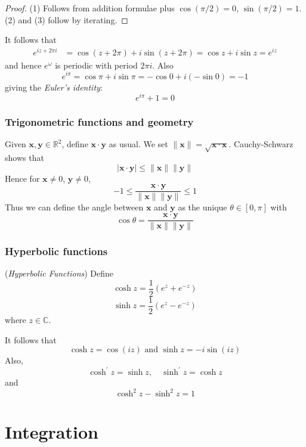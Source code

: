 \documentclass[10pt, a4paper, twoside]{report}
\begin{document}
\begin{proof}
    (1) Follows from addition formulae plus \(\cos(\pi/2)=0\), \(\sin(\pi/2)=1\). (2) and (3) follow by iterating.
\end{proof}
It follows that 
\begin{align*}
    e^{iz+2\pi i}&=\cos(z+2\pi)+i\sin(z+2\pi)=\cos z+i\sin z=e^{iz}
\end{align*}
and hence \(e^\omega\) is periodic with period \(2\pi i\). Also 
\[e^{i\pi}=\cos\pi+i\sin\pi=-\cos 0+i(-\sin 0)=-1\]
giving the \emph{Euler's identity}:
\[e^{i\pi}+1=0\]
\subsubsection{Trigonometric functions and geometry}
Given \(\mathbf{x},\mathbf{y}\in\mathbb{R}^2\), define \(\mathbf{x}\cdot\mathbf{y}\) as usual. We set \(\|\mathbf{x}\|=\sqrt{\mathbf{x}\cdot\mathbf{x}}\). Cauchy-Schwarz shows that 
\[|\mathbf{x}\cdot\mathbf{y}|\leq\|\mathbf{x}\|\|\mathbf{y}\|\]
Hence for \(\mathbf{x}\neq 0\), \(\mathbf{y}\neq 0\),
\[-1\leq\frac{\mathbf{x}\cdot\mathbf{y}}{\|\mathbf{x}\|\|\mathbf{y}\|}\leq 1\]
Thus we can define the angle between \(\mathbf{x}\) and \(\mathbf{y}\) as the unique \(\theta\in[0,\pi]\) with 
\[\cos\theta=\frac{\mathbf{x}\cdot\mathbf{y}}{\|\mathbf{x}\|\|\mathbf{y}\|}\]
\subsubsection{Hyperbolic functions}
\begin{definition}
    (\emph{Hyperbolic Functions}) Define 
    \[\cosh z=\frac 12(e^z+e^{-z})\]
    \[\sinh z=\frac 12(e^z-e^{-z})\]
    where \(z\in\mathbb{C}\).
\end{definition}
It follows that 
\[\cosh z=\cos(iz)\text{  and }\sinh z=-i\sin(iz)\]
Also,
\[\cosh^\prime z=\sinh z,\quad\sinh^\prime z=\cosh z\]
and 
\[\cosh^2z-\sinh^2 z=1\]
\section{Integration}
\end{document}
